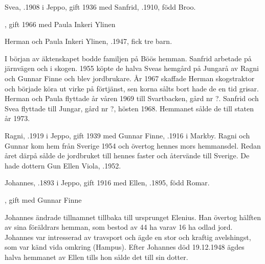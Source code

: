 Svea, .1908 i Jeppo, gift 1936 med Sanfrid, .1910, född Broo.
\begin{jhchildren}
  \item {}
  \item {}
  \item {}, gift 1966 med Paula Inkeri Ylinen
\end{jhchildren}

Herman och Paula Inkeri Ylinen, .1947, fick tre barn.
\begin{jhchildren}
  \item {}
  \item {}
  \item {}
\end{jhchildren}

I början av äktenskapet bodde familjen på Böös hemman. Sanfrid arbetade på järnvägen och i skogen. 1955 köpte de halva Sveas hemgård på Jungarå av Ragni och Gunnar Finne och blev jordbrukare. År 1967 skaffade Herman skogstraktor och började köra ut virke på förtjänst, sen korna sålts bort hade de en tid grisar. Herman och 	Paula flyttade år våren 1969 till Svartbacken, gård nr ?.  Sanfrid och Svea flyttade till Jungar, gård nr ?, hösten 1968. Hemmanet sålde de till staten år 1973.


Ragni, .1919 i Jeppo, gift 1939 med Gunnar Finne, .1916 i Markby. Ragni och Gunnar kom hem från Sverige 1954 och övertog hennes mors hemmansdel. Redan året därpå sålde de jordbruket till  hennes faster och återvände till Sverige. De hade dottern Gun Ellen Viola, .1952.


Johannes, .1893 i Jeppo, gift 1916 med Ellen, .1895, född Romar.
\begin{jhchildren}
  \item {}
  \item {}, gift med Gunnar Finne
\end{jhchildren}
Johannes ändrade tillnamnet tillbaka till ursprunget Elenius. Han övertog hälften av sina föräldrars hemman, som bestod av 44 ha varav 16 ha odlad jord. Johannes var intresserad av travsport och ägde en stor och kraftig avelshingst, som var känd vida omkring (Hampus). Efter Johannes död 19.12.1948 ägdes halva hemmanet av Ellen tills hon sålde det till sin dotter.



